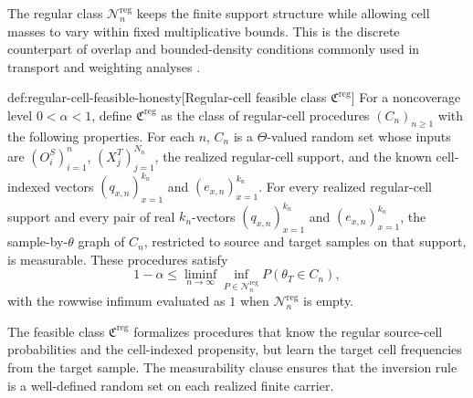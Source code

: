The regular class \(\mathcal N_n^{\mathrm{reg}}\) keeps the finite support structure while allowing cell masses to vary within fixed multiplicative bounds.  This is the discrete counterpart of overlap and bounded-density conditions commonly used in transport and weighting analyses \citep{ChenHuang2025,RudolphVanderLaan2017,ZengKennedyBodnarNaimi2024}.

\begin{definitionv}{def:regular-cell-feasible-honesty}[Regular-cell feasible class $\mathfrak C^{\mathrm{reg}}$]
For a noncoverage level \(0<\alpha<1\), define \(\mathfrak C^{\mathrm{reg}}\) as the class of regular-cell procedures \((C_n)_{n\ge 1}\) with the following properties. For each \(n\), \(C_n\) is a \(\Theta\)-valued random set whose inputs are \((O_i^S)_{i=1}^n\), \((X_j^T)_{j=1}^{N_n}\), the realized regular-cell support, and the known cell-indexed vectors \((q_{x,n})_{x=1}^{k_n}\) and \((e_{x,n})_{x=1}^{k_n}\). For every realized regular-cell support and every pair of real \(k_n\)-vectors \((q_{x,n})_{x=1}^{k_n}\) and \((e_{x,n})_{x=1}^{k_n}\), the sample-by-\(\theta\) graph of \(C_n\), restricted to source and target samples on that support, is measurable. These procedures satisfy
\[
1-\alpha\le
\liminf_{n\to\infty}
\inf_{P\in\mathcal N_n^{\mathrm{reg}}}
P(\theta_T\in C_n),
\]
with the rowwise infimum evaluated as \(1\) when \(\mathcal N_n^{\mathrm{reg}}\) is empty.
\end{definitionv}

The feasible class \(\mathfrak C^{\mathrm{reg}}\) formalizes procedures that know the regular source-cell probabilities and the cell-indexed propensity, but learn the target cell frequencies from the target sample.  The measurability clause ensures that the inversion rule is a well-defined random set on each realized finite carrier.

